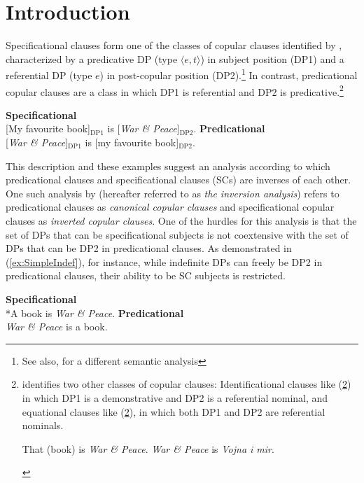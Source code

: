 \documentclass[
]{RCL}
\begin{document}
\section{Introduction}
Specificational clauses form one of the classes of copular clauses identified by \citet{higgins1973pseudo}, characterized by a predicative DP (type $\langle e,t\rangle$) in subject position (DP1) and a referential DP (type $e$) in post-copular position (DP2).\footnote{See also, \citet{romero2005concealed} for a different semantic analysis}
In contrast, predicational copular clauses are a class in which DP1 is referential and DP2 is predicative.\footnote{
	\citet{higgins1973pseudo} identifies two other classes of copular clauses:
	Identificational clauses like (\ref{ex:IDCl}) in which DP1 is a demonstrative and DP2 is a referential nominal, and equational clauses like (\ref{ex:EqCl}), in which both DP1 and DP2 are referential nominals.
	\begin{xlisti}
		\ex\label{ex:IDCl} That (book) is \textit{War \& Peace}.
		\ex\label{ex:EqCl} \textit{War \& Peace} is \textit{Vojna i mir}.	
	\end{xlisti}

}
\begin{exe}
	\ex
	\begin{xlist}	
		\ex\label{ex:SC} \textbf{Specificational}\\
		{[My favourite book]$_{\text{DP1}}$} is {[\textit{War \& Peace}]$_{\text{DP2}}$}.
		\ex\label{ex:PC} \textbf{Predicational}\\
		{[\textit{War \& Peace}]$_{\text{DP1}}$} is {[my favourite book]$_{\text{DP2}}$}.
	\end{xlist}
\end{exe}
This description and these examples suggest an analysis according to which predicational clauses and specificational clauses (SCs) are inverses of each other.
One such analysis by \citet{moro1997raising} (hereafter referred to as \textit{the inversion analysis}) refers to predicational clauses as \textit{canonical copular clauses} and specificational copular clauses as \textit{inverted copular clauses}.
One of the hurdles for this analysis is that the set of DPs that can be specificational subjects is not coextensive with the set of DPs that can be DP2 in predicational clauses.
As demonstrated in (\ref{ex:SimpleIndef}), for instance, while indefinite DPs can freely be DP2 in predicational clauses, their ability to be SC subjects is restricted. 
\begin{exe}
	\ex\label{ex:SimpleIndef}
	\begin{xlist}
		\ex  \textbf{Specificational}\\
		*A book is \textit{War \& Peace}.
		\ex \textbf{Predicational}\\
		\textit{War \& Peace} is a book.	
	\end{xlist}
\end{exe}
\end{document}

